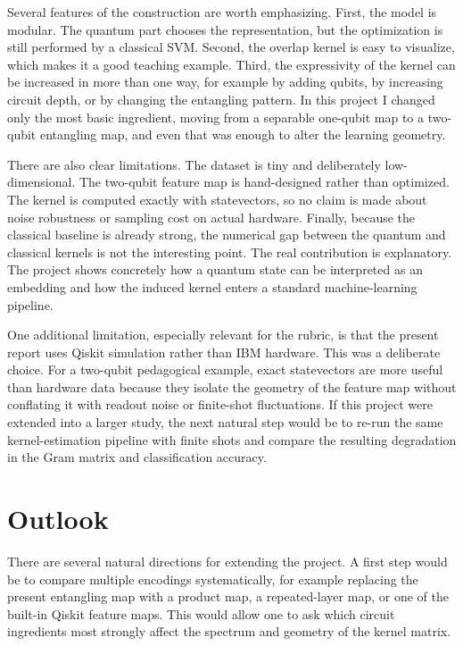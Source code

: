 \documentclass[11pt]{article}
\begin{document}
Several features of the construction are worth emphasizing. First, the model is modular. The quantum part chooses the representation, but the optimization is still performed by a classical SVM. Second, the overlap kernel is easy to visualize, which makes it a good teaching example. Third, the expressivity of the kernel can be increased in more than one way, for example by adding qubits, by increasing circuit depth, or by changing the entangling pattern. In this project I changed only the most basic ingredient, moving from a separable one-qubit map to a two-qubit entangling map, and even that was enough to alter the learning geometry.

There are also clear limitations. The dataset is tiny and deliberately low-dimensional. The two-qubit feature map is hand-designed rather than optimized. The kernel is computed exactly with statevectors, so no claim is made about noise robustness or sampling cost on actual hardware. Finally, because the classical baseline is already strong, the numerical gap between the quantum and classical kernels is not the interesting point. The real contribution is explanatory. The project shows concretely how a quantum state can be interpreted as an embedding and how the induced kernel enters a standard machine-learning pipeline.

One additional limitation, especially relevant for the rubric, is that the present report uses Qiskit simulation rather than IBM hardware. This was a deliberate choice. For a two-qubit pedagogical example, exact statevectors are more useful than hardware data because they isolate the geometry of the feature map without conflating it with readout noise or finite-shot fluctuations. If this project were extended into a larger study, the next natural step would be to re-run the same kernel-estimation pipeline with finite shots and compare the resulting degradation in the Gram matrix and classification accuracy.

\section{Outlook}

There are several natural directions for extending the project. A first step would be to compare multiple encodings systematically, for example replacing the present entangling map with a product map, a repeated-layer map, or one of the built-in Qiskit feature maps. This would allow one to ask which circuit ingredients most strongly affect the spectrum and geometry of the kernel matrix.
\end{document}
